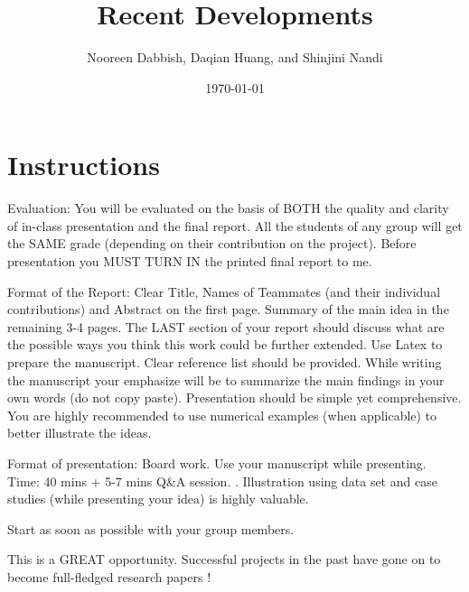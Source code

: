 \documentclass[11pt]{article}
\title{Recent Developments}
\author{Nooreen Dabbish, Daqian Huang, and Shinjini Nandi}
\date{\today}
\begin{document}
\maketitle


\begin{abstract}

\end{abstract}

\section{Instructions}
\label{sec-1}

Evaluation: You will be evaluated on the basis of BOTH the quality and clarity of in-class presentation and the final report. All the students of any group will get the SAME grade (depending on their contribution on the project). Before presentation you MUST TURN IN the printed final report to me.
 
Format of the Report: Clear Title, Names of Teammates (and their individual contributions) and Abstract on the first page. Summary of the main idea in the remaining 3-4 pages. The LAST section of your report should discuss what are the possible ways you think this work could be further extended. Use Latex to prepare the manuscript. Clear reference list should be provided. While writing the manuscript your emphasize will be to summarize the main findings in your own words (do not copy paste). Presentation should be simple yet comprehensive. You are highly recommended to use numerical examples (when applicable) to better illustrate the ideas.
 
Format of presentation: Board work. Use your manuscript while presenting. Time: 40 mins + 5-7 mins Q\&A session. . Illustration using data set and case studies (while presenting your idea) is highly valuable.
 
Start as soon as possible with your group members.
 
This is a GREAT opportunity. Successful projects in the past have gone
on to become full-fledged research papers !
\end{document}
